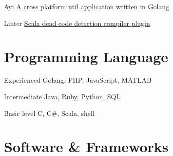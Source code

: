 \documentclass[fontsize=10pt]{tccv}
\begin{document}
\begin{factlist}

\item{Ayi}
     {\href{https://github.com/dyweb/Ayi}{A cross platform util application written in Golang}}


\item{Linter}
    {\href{https://github.com/at15/scala-linter}{Scala dead code detection compiler plugin}}


\end{factlist}




%

\section{Programming Language}

\begin{factlist}

\item{Experienced}
     {Golang, PHP, JavaScript, MATLAB}


\item{Intermediate}
     {Java, Ruby, Python, SQL}

\item{Basic level}
     {C, C\#, Scala, shell}

\end{factlist}

\section{Software \& Frameworks}
\end{document}
